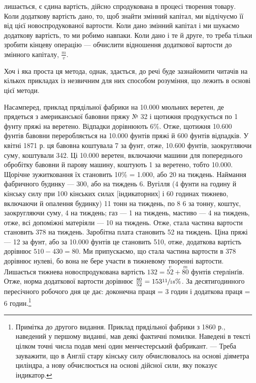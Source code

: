 \parcont{}  %
лишається, є єдина вартість, дійсно спродукована в процесі творення товару. Коли додаткову вартість
дано, то, щоб знайти змінний капітал, ми відлічуємо її від цієї новоспродукованої вартости.
Коли дано змінний капітал і ми шукаємо додаткову вартість, то ми робимо навпаки. Коли дано і те й
друге, то треба тільки зробити кінцеву операцію — обчислити відношення додаткової вартости до
змінного капіталу, $\frac{m}{v}$.

Хоч і яка проста ця метода, однак, здається, до речі буде зазнайомити читачів на кількох прикладах
із незвичним для них
способом розуміння, що лежить в основі цієї методи.

Насамперед, приклад прядільної фабрики на \num{10.000} мюльних веретен, де прядеться з американської
бавовни пряжу № 32 і
щотижня продукується по 1 фунту пряжі на веретено. Відпадки дорівнюють 6\%. Отже, щотижня \num{10.600}
фунтів бавовни переробляється на \num{10.000} фунтів пряжі й 600 фунтів відпадків. У квітні 1871 р. ця
бавовна коштувала 7 за фунт, отже, \num{10.600} фунтів, заокругляючи суму, коштували 342. Ці \num{10.000}
веретен, включаючи машини для попереднього обробітку бавовни й парову машину, коштують 1 за веретено, тобто \num{10.000}. Щорічне зужитковання їх становить
10\% = \num{1.000}, або 20 на тиждень. Наймання фабричного будинку —
300, або на тиждень 6. Вугілля (4 фунти на годину
й кінську силу при 100 кінських силах [індикаторних] і 60 годинах тижнево, включаючи й опалення
будинку) 11 тонн
на тиждень, по 8 6 за тонну, коштує, заокругляючи суму, 4 на
тиждень; газ — 1 на тиждень, мастиво — 4 на тиждень, отже, всі
допоміжні матеріяли — 10 на тиждень. Отже, стала частина вартости становить 378
на тиждень. Заробітна плата становить 52 на тиждень. Ціна пряжі — 12 за
фунт, або за \num{10.000} фунтів
це становить 510, отже, додаткова вартість дорівнює $510 - 430 = 80$. Ми припускаємо, що стала частина вартости в 378 дорівнює нулеві, бо
вона не бере участи в тижневому творенні вартости.
Лишається тижнева новоспродукована вартість $132 = \overset{v}{52} + \overset{m}{80}$ фунтів стерлінґів. Отже, норма
додаткової вартости дорівнює
$\frac{80}{52} = 153\sfrac{11}{18}\%$. За десятигодинного пересічного робочого дня це дає: доконечна праця = 3
годин і додаткова праця = 6 годин.\footnote{
Примітка до другого видання. Приклад прядільної фабрики з 1860 р., наведений у першому виданні,
мав деякі фактичні помилки. Наведені в тексті цілком точні числа подав мені один менчестерський
фабрикант. — Треба зауважити, що в Англії стару кінську силу обчислювалось
на основі діяметра циліндра, а нову обчислюється на основі дійсної сили, яку показує індикатор.
}
